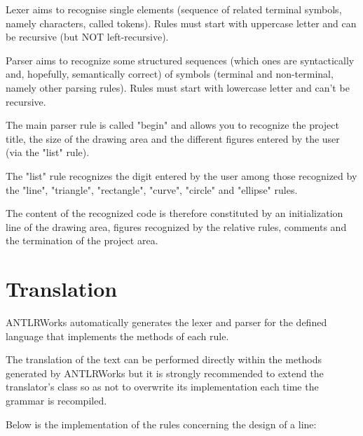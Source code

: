 \documentclass[a4paper]{article}
\begin{document}
Lexer aims to recognise single elements (sequence of related terminal symbols, namely characters, called tokens).
Rules must start with uppercase  letter and can be recursive (but NOT left-recursive).
 
Parser aims to  recognize  some  structured sequences (which ones are syntactically and, hopefully, semantically correct)
of symbols (terminal and  non-terminal, namely other parsing
rules).
Rules must start with lowercase letter and can't be recursive.

The main parser rule is called "begin" and allows you to recognize the project title, the size of the drawing area and the different figures entered by the user (via the "list" rule).

The "list" rule recognizes the digit entered by the user among those recognized by the "line", "triangle", "rectangle", "curve", "circle" and "ellipse" rules.

The content of the recognized code is therefore constituted by an initialization line of the drawing area, figures recognized by the relative rules, comments and the termination of the project area.

\newpage

\section{Translation}

ANTLRWorks automatically generates the lexer and parser for the defined language that implements the methods of each rule.

The translation of the text can be performed directly within the methods generated by ANTLRWorks but it is strongly recommended to extend the translator's class so as not to overwrite its implementation each time the grammar is recompiled.

\vspace{1\baselineskip}

Below is the implementation of the rules concerning the design of a line:
\end{document}
